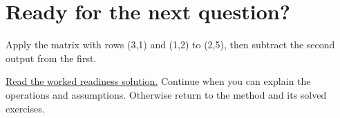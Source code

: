 \section*{Ready for the next question?}
\label{readiness:matrix_maps}
Apply the matrix with rows (3,1) and (1,2) to (2,5), then subtract the second output from the first.
\par\hyperref[solution:ready:matrix_maps]{Read the worked readiness solution.} Continue when you can explain the operations and assumptions. Otherwise return to the method and its solved exercises.
